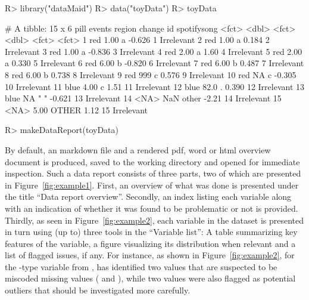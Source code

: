 \documentclass[article,shortnames]{jss}
\begin{document}
\begin{Schunk}
\begin{Sinput}
R> library("dataMaid")
R> data("toyData")
R> toyData
\end{Sinput}
\begin{Soutput}
# A tibble: 15 x 6
   pill  events region change id    spotifysong
   <fct>  <dbl> <fct>   <dbl> <fct> <fct>      
 1 red     1.00 a      -0.626 1     Irrelevant 
 2 red     1.00 a       0.184 2     Irrelevant 
 3 red     1.00 a      -0.836 3     Irrelevant 
 4 red     2.00 a       1.60  4     Irrelevant 
 5 red     2.00 a       0.330 5     Irrelevant 
 6 red     6.00 b      -0.820 6     Irrelevant 
 7 red     6.00 b       0.487 7     Irrelevant 
 8 red     6.00 b       0.738 8     Irrelevant 
 9 red   999    c       0.576 9     Irrelevant 
10 red    NA    c      -0.305 10    Irrelevant 
11 blue    4.00 c       1.51  11    Irrelevant 
12 blue   82.0  .       0.390 12    Irrelevant 
13 blue   NA    " "    -0.621 13    Irrelevant 
14 <NA>  NaN    other  -2.21  14    Irrelevant 
15 <NA>    5.00 OTHER   1.12  15    Irrelevant 
\end{Soutput}
\end{Schunk}

\begin{Schunk}
\begin{Sinput}
R> makeDataReport(toyData)
\end{Sinput}
\end{Schunk}

By default, an  markdown file and a rendered pdf,  word or html
overview document is produced, saved to the working directory and
opened for immediate inspection. Such a data report consists of three
parts, two of which are presented in Figure~\ref{fig:example1}. First,
an overview of what was done is presented under the title ``Data
  report overview''. Secondly, an index listing each variable along
with an indication of whether it was found to be problematic or not is
provided. Thirdly, as seen in Figure~\ref{fig:example2}, each variable
in the dataset is presented in turn using (up to) three tools in the
``Variable list'': A table summarizing key features of the
variable, a figure visualizing its distribution when relevant and a list of flagged
issues, if any. For instance, as shown in Figure~\ref{fig:example2},
for the -type variable  from
,  has identified two values that
are suspected to be miscoded missing values ( and
), while two values were also flagged as potential outliers
that should be investigated more carefully.
\end{document}
